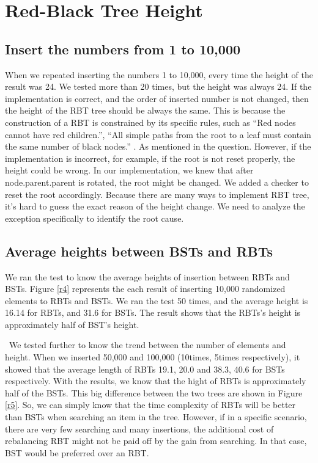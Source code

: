 \documentclass[12pt]{article}
\begin{document}
\newpage

\bigskip

\section{Red-Black Tree Height}
\subsection{Insert the numbers from 1 to 10,000}
When we repeated inserting the numbers 1 to 10,000, every time the height of the result was 24. We tested more than 20 times, but the height was always 24. If the implementation is correct, and the order of inserted number is not changed, then the height of the RBT tree should be always the same. This is because the construction of a RBT is constrained by its specific rules, such as ``Red nodes cannot have red children.'', ``All simple paths from the root to a leaf must contain the same number of black nodes.'' . As mentioned in the question. 
However, if the implementation is incorrect, for example, if the root is not reset properly, the height could be wrong.  In our implementation, we knew that after node.parent.parent is rotated, the root might be changed. We added a checker to reset the root accordingly.  Because there are many ways to implement RBT tree,  it's hard to guess the exact reason of the height change. We need to analyze the exception specifically to identify the root cause.

\subsection{Average heights between BSTs and RBTs}
We ran the test to know the average heights of insertion between RBTs and BSTs. Figure \ref{r4} represents the each result of inserting 10,000 randomized elements to RBTs and BSTs. We ran the test 50 times, and the average height is 16.14 for RBTs, and 31.6 for BSTs. The result shows that the RBTs's height is approximately half of BST's height. 

~\newline\noindent We tested further to know the trend between the number of elements and height. When we inserted 50,000 and 100,000 (10times, 5times respectively), it showed that the average length of RBTs 19.1, 20.0 and 38.3, 40.6 for BSTs respectively. With the results, we know that the hight of RBTs is approximately half of the BSTs. This big difference between the two trees are shown in Figure \ref{r5}. So, we can simply know that the time complexity of RBTs will be better than BSTs when searching an item in the tree. However, if in a specific scenario, there are very few searching and many insertions, the additional cost of rebalancing RBT might not be paid off by the gain from searching. In that case, BST would be preferred over an RBT.
\end{document}
